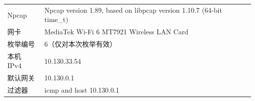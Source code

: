 \begin{tabularx}{\textwidth}{lX}\toprule
Npcap & Npcap version 1.89, based on libpcap version 1.10.7 (64-bit time\_t) \\
网卡 & MediaTek Wi-Fi 6 MT7921 Wireless LAN Card \\
枚举编号 & 6（仅对本次枚举有效） \\
本机 IPv4 & 10.130.33.54 \\
默认网关 & 10.130.0.1 \\
过滤器 & icmp and host 10.130.0.1 \\
\bottomrule\end{tabularx}
